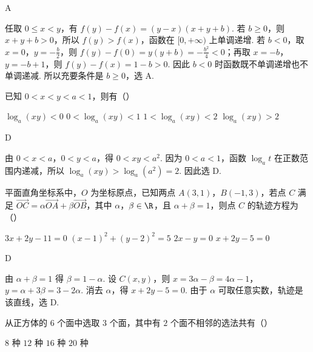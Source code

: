 \begin{answer}
A
\end{answer}

\begin{solution}
任取 \(0\leqslant x<y\)，有 \(f(y)-f(x)=(y-x)(x+y+b)\). 若 \(b\geqslant0\)，则 \(x+y+b>0\)，所以 \(f(y)>f(x)\)，函数在 \([0,+\infty)\) 上单调递增. 若 \(b<0\)，取 \(x=0\)，\(y=-\frac{b}{2}\)，则 \(f(y)-f(0)=y(y+b)=-\frac{b^{2}}{4}<0\)；再取 \(x=-b\)，\(y=-b+1\)，则 \(f(y)-f(x)=1-b>0\). 因此 \(b<0\) 时函数既不单调递增也不单调递减. 所以充要条件是 \(b\geqslant0\)，选 A.
\end{solution}

\begin{problem}
已知 \(0 < x < y < a < 1\)，则有（\quad）

\choices
    {\(\log_a(xy) < 0\)}
    {\(0 < \log_a(xy) < 1\)}
    {\(1 < \log_a(xy) < 2\)}
    {\(\log_a(xy) > 2\)}
\end{problem}

\begin{answer}
D
\end{answer}

\begin{solution}
由 \(0<x<a\)，\(0<y<a\)，得 \(0<xy<a^{2}\). 因为 \(0<a<1\)，函数 \(\log_{a}t\) 在正数范围内递减，所以
\(\log_{a}(xy)>\log_{a}(a^{2})=2\). 因此选 D.
\end{solution}

\begin{problem}
平面直角坐标系中，\(O\) 为坐标原点，已知两点 \(A(3,1)\)，\(B(-1,3)\)，若点 \(C\) 满足 \(\overrightarrow{OC} = \alpha \overrightarrow{OA} + \beta \overrightarrow{OB}\)，其中 \(\alpha\)，\(\beta \in \R\)，且 \(\alpha + \beta = 1\)，则点 \(C\) 的轨迹方程为（\quad）

\choices
    {\(3x + 2y - 11 = 0\)}
    {\((x - 1)^{2} + (y - 2)^{2} = 5\)}
    {\(2x - y = 0\)}
    {\(x + 2y - 5 = 0\)}
\end{problem}

\begin{answer}
D
\end{answer}

\begin{solution}
由 \(\alpha+\beta=1\) 得 \(\beta=1-\alpha\). 设 \(C(x,y)\)，则
\(x=3\alpha-\beta=4\alpha-1\)，\(y=\alpha+3\beta=3-2\alpha\). 消去 \(\alpha\)，得 \(x+2y-5=0\). 由于 \(\alpha\) 可取任意实数，轨迹是该直线，选 D.
\end{solution}

\begin{problem}
从正方体的 \(6\text{ 个}\)面中选取 \(3\text{ 个}\)面，其中有 \(2\text{ 个}\)面不相邻的选法共有（\quad）

\choices
    {\(8\text{ 种}\)}
    {\(12\text{ 种}\)}
    {\(16\text{ 种}\)}
    {\(20\text{ 种}\)}
\end{problem}

